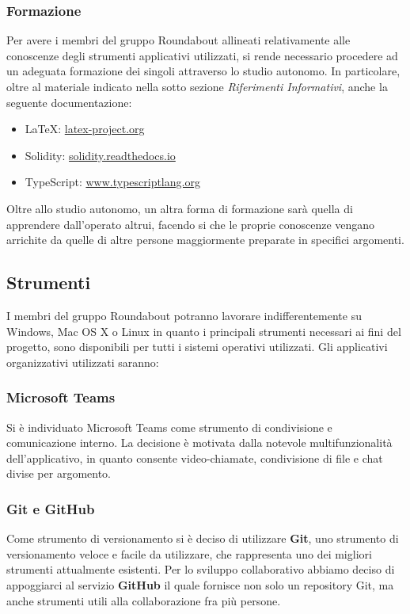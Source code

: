 	\subsubsection{Formazione}
		Per avere i membri del gruppo Roundabout allineati relativamente alle conoscenze degli strumenti applicativi utilizzati, si rende necessario procedere ad un adeguata formazione dei singoli attraverso lo studio autonomo. In particolare, oltre al materiale indicato nella sotto sezione \textit{Riferimenti Informativi}, anche la seguente documentazione:
		\begin{itemize}
			\item \LaTeX{}: \href{latex-project.org}{latex-project.org}
			\item Solidity: \href{solidity.readthedocs.io}{solidity.readthedocs.io}
			\item TypeScript: \href{www.typescriptlang.org}{www.typescriptlang.org}
		\end{itemize}
		Oltre allo studio autonomo, un altra forma di formazione sarà quella di apprendere dall'operato altrui, facendo si che le proprie conoscenze vengano arrichite da quelle di altre persone maggiormente preparate in specifici argomenti.
		
	

\subsection{Strumenti}
	I membri del gruppo Roundabout potranno lavorare indifferentemente su Windows, Mac OS X o Linux in quanto i principali strumenti necessari ai fini del progetto, sono disponibili per tutti i sistemi operativi utilizzati. Gli applicativi organizzativi utilizzati saranno:
	
	\subsubsection{Microsoft Teams}
		Si è individuato Microsoft Teams come strumento di condivisione e comunicazione interno. La decisione è motivata dalla notevole multifunzionalità dell'applicativo, in quanto consente video-chiamate, condivisione di file e chat divise per argomento.
		
	\subsubsection{Git e GitHub}
		Come strumento di versionamento si è deciso di utilizzare \textbf{Git}, uno strumento di versionamento veloce e facile da utilizzare, che rappresenta uno dei migliori strumenti attualmente esistenti. Per lo sviluppo collaborativo abbiamo deciso di appoggiarci al servizio \textbf{GitHub} il quale fornisce non solo un repository Git, ma anche strumenti utili alla collaborazione fra più persone.
		
